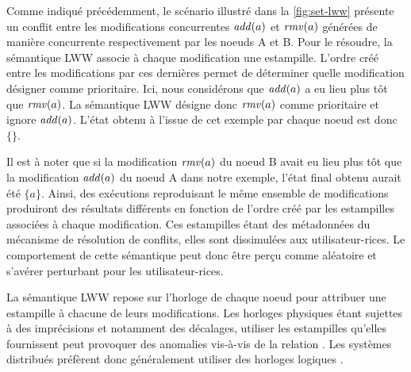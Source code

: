 Comme indiqué précédemment, le scénario illustré dans la \autoref{fig:set-lww} présente un conflit entre les modifications concurrentes $\mathit{add}(a)$ et $\mathit{rmv}(a)$ générées de manière concurrente respectivement par les noeuds A et B.
Pour le résoudre, la sémantique \ac{LWW} associe à chaque modification une estampille.
L'ordre créé entre les modifications par ces dernières permet de déterminer quelle modification désigner comme prioritaire.
Ici, nous considérons que $\mathit{add}(a)$ a eu lieu plus tôt que $\mathit{rmv}(a)$.
La sémantique \ac{LWW} désigne donc $\mathit{rmv}(a)$ comme prioritaire et ignore $\mathit{add}(a)$.
L'état obtenu à l'issue de cet exemple par chaque noeud est donc $\{\}$.

Il est à noter que si la modification $\mathit{rmv}(a)$ du noeud B avait eu lieu plus tôt que la modification $\mathit{add}(a)$ du noeud A dans notre exemple, l'état final obtenu aurait été $\{a\}$.
Ainsi, des exécutions reproduisant le même ensemble de modifications produiront des résultats différents en fonction de l'ordre créé par les estampilles associées à chaque modification.
Ces estampilles étant des métadonnées du mécanisme de résolution de conflits, elles sont dissimulées aux utilisateur-rices.
Le comportement de cette sémantique peut donc être perçu comme aléatoire et s'avérer perturbant pour les utilisateur-rices.

La sémantique \ac{LWW} repose sur l'horloge de chaque noeud pour attribuer une estampille à chacune de leurs modifications.
Les horloges physiques étant sujettes à des imprécisions et notamment des décalages, utiliser les estampilles qu'elles fournissent peut provoquer des anomalies vis-à-vis de la relation \hb.
Les systèmes distribués préfèrent donc généralement utiliser des horloges logiques \cite{1978-happen-before-lamport}.
